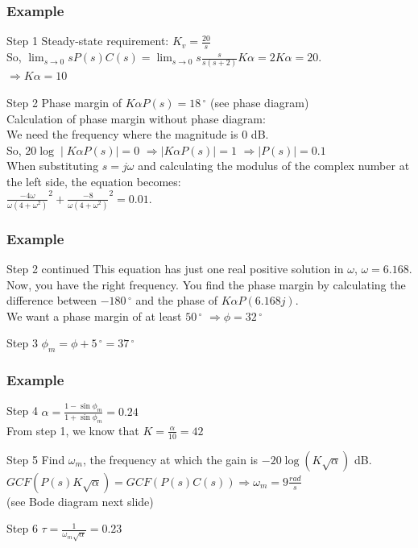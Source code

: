 \begin{frame}
\frametitle{Example}
\begin{block}{Step 1}
Steady-state requirement: $K_v = \frac{20}{s}$ \\
So, $\lim_{s \to 0} sP(s)C(s) = \lim_{s \to 0} s\frac{s}{s(s+2)}K\alpha = 2K\alpha = 20$. \\
$\Rightarrow K\alpha = 10$
\end{block}
\begin{block}{Step 2}
Phase margin of $K\alpha P(s) = 18\,^{\circ}$ (see phase diagram) \\
Calculation of phase margin without phase diagram: \\
We need the frequency where the magnitude is 0 dB. \\So, $20\log \mid K\alpha P(s) \mid = 0$
$\Rightarrow \mid K\alpha P(s) \mid = 1$
$\Rightarrow \mid P(s) \mid = 0.1$ \\
When substituting $s = j\omega$ and calculating the modulus of the complex number at the left side, the equation becomes: \\
$\frac{-4\omega}{\omega (4 + \omega^2)}^2 + \frac{-8}{\omega (4 + \omega^2)}^2 = 0.01$.

\end{block}
\end{frame}

\begin{frame}
	\frametitle{Example}
\begin{block}{Step 2 continued}
This equation has just one real positive solution in $\omega$, $\omega = 6.168$.\\
Now, you have the right frequency. You find the phase margin by calculating the difference between $-180\,^{\circ}$ and the phase of $K\alpha P(6.168j)$.\\ 
We want a phase margin of at least $50\,^{\circ}$
$\Rightarrow \phi = 32\,^{\circ}$
\end{block}
\begin{block}{Step 3}
	$\phi_m = \phi + 5\,^{\circ} = 37\,^{\circ}$
\end{block}
\end{frame}

\begin{frame}
	\frametitle{Example}
	\begin{block}{Step 4}
	 $\alpha = \frac{1 - \sin \phi_m}{1 + \sin \phi_m} = 0.24$ \\
	 From step 1, we know that $K = \frac{\alpha}{10} = 42$
	\end{block}
	\begin{block}{Step 5}
	Find $\omega_m$, the frequency at which the gain is $-20\log(K\sqrt{\alpha})$ dB. 
	$GCF(P(s)K\sqrt{\alpha}) = GCF(P(s)C(s)) \Rightarrow \omega_m = 9 \frac{rad}{s}$ \\
	(see Bode diagram next slide)
	\end{block}
	\begin{block}{Step 6}
	$\tau = \frac{1}{\omega_m\sqrt{\alpha}} = 0.23$
	\end{block}
\end{frame}

